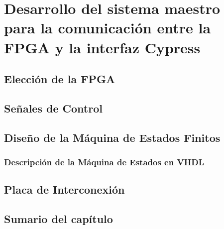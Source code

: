 \chapter{Desarrollo del sistema maestro para la comunicación entre la FPGA y la interfaz Cypress}
	\label{cap:fpga}
	
%		
	\section{Elección de la FPGA}
		\label{mats:fpga}
		
	\section{Señales de Control}
		\label{fpga:sigs}
		
	\section{Diseño de la Máquina de Estados Finitos}
		
		\subsection{Descripción de la Máquina de Estados en VHDL}
			
	\section{Placa de Interconexión}
		
	\section{Sumario del capítulo}
		